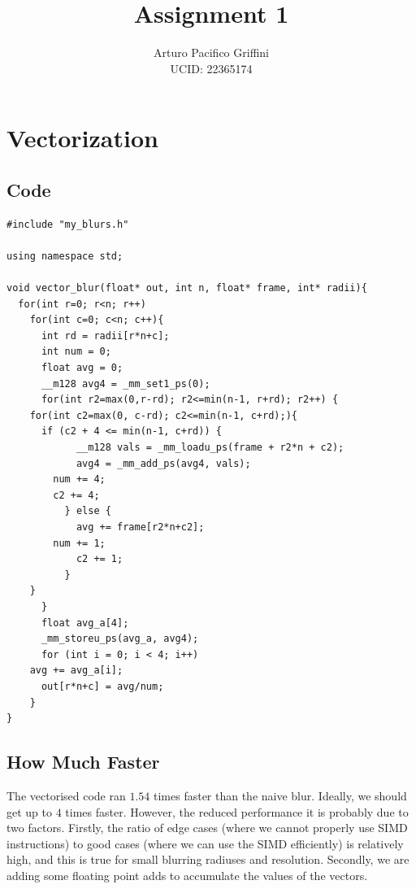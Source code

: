 \documentclass[11pt,letter]{article}
\title{Assignment 1 }
\author{Arturo Pacifico Griffini\\
  UCID: 22365174}
\date{}
\begin{document}
%

\pagebreak



\section{Vectorization}
\subsection{Code}
\begin{lstlisting}[label=some-code,caption=vector\_blur.cpp]
#include "my_blurs.h"

using namespace std;

void vector_blur(float* out, int n, float* frame, int* radii){
  for(int r=0; r<n; r++)
    for(int c=0; c<n; c++){
      int rd = radii[r*n+c];
      int num = 0;
      float avg = 0;
      __m128 avg4 = _mm_set1_ps(0);
      for(int r2=max(0,r-rd); r2<=min(n-1, r+rd); r2++) {
	for(int c2=max(0, c-rd); c2<=min(n-1, c+rd);){
	  if (c2 + 4 <= min(n-1, c+rd)) {
            __m128 vals = _mm_loadu_ps(frame + r2*n + c2);
            avg4 = _mm_add_ps(avg4, vals);
	    num += 4;
	    c2 += 4;
          } else {
            avg += frame[r2*n+c2];
	    num += 1;
            c2 += 1;
          }
	}
      }
      float avg_a[4];
      _mm_storeu_ps(avg_a, avg4);
      for (int i = 0; i < 4; i++)
	avg += avg_a[i];
      out[r*n+c] = avg/num;
    }
}
\end{lstlisting}

\subsection{How Much Faster}
The vectorised code ran $1.54$ times faster than the naive blur. Ideally, we should get up to $4$ times faster. However, the reduced performance it is probably due to two factors. Firstly, the ratio of edge cases (where we cannot properly use SIMD instructions) to good cases (where we can use the SIMD efficiently) is relatively high, and this is true for small blurring radiuses and resolution. Secondly, we are adding some floating point adds to accumulate the values of the vectors. 
\end{document}
